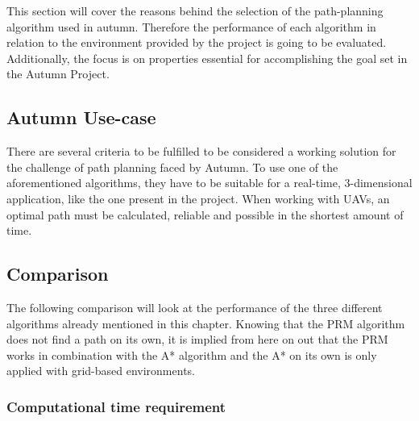 This section will cover the reasons behind the selection of the path-planning algorithm used in autumn. Therefore the performance of each algorithm in relation to the environment provided by the project is going to be evaluated. Additionally, the focus is on properties essential for accomplishing the goal set in the Autumn Project.

\subsection{Autumn Use-case}

There are several criteria to be fulfilled to be considered a working solution for the challenge of path planning faced by Autumn.
To use one of the aforementioned algorithms, they have to be suitable for a real-time, 3-dimensional application, like the one present in the project.
When working with UAVs, an optimal path must be calculated, reliable and possible in the shortest amount of time. 

\subsection{Comparison}

The following comparison will look at the performance of the three different algorithms already mentioned in this chapter. Knowing that the PRM algorithm does not find a path on its own, it is implied from here on out that the PRM works in combination with the A* algorithm and the A* on its own is only applied with grid-based environments.  

\subsubsection{Computational time requirement}

